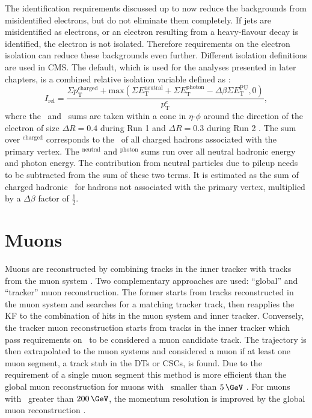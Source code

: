 The identification requirements discussed up to now reduce the backgrounds 
from misidentified electrons, but do not eliminate them completely. If jets are
misidentified as electrons, or an electron resulting from a heavy-flavour 
decay is identified, the electron is not isolated. Therefore requirements
on the electron isolation can reduce these backgrounds even further.
Different isolation definitions are used in \ac{CMS}. The default, which is
used for the analyses presented in later chapters, is a combined relative isolation variable
defined as \cite{SMHtautauCMS}:
\begin{equation}\label{eqn:electron_reliso}
I_{\text{rel}} = \frac{\Sigma p_{\text{T}}^{\text{charged}} + \mathrm{max}(\Sigma E_{\text{T}}^{\text{neutral}} + \Sigma E_{\text{T}}^{\text{photon}} - \Delta\beta \Sigma E_{\text{T}}^{\text{PU}},0)}{p_{\text{T}}^{e}},
\end{equation}
where the \pT~and \ET~sums are taken within a cone in $\eta$-$\phi$ around the direction
of the electron of size $\Delta R = 0.4$ during Run 1 and $\Delta R = 0.3$ during Run 2 \cite{CMS-PAS-HIG-16-037}.
The sum over \pT$^{\text{charged}}$ corresponds to the \pT~of all charged %
hadrons associated with the primary vertex. %
The \ET$^{\text{neutral}}$ and \ET$^{\text{photon}}$ sums
run over all neutral hadronic energy and photon energy. %
The contribution from neutral particles due to pileup needs to be subtracted from
the sum of these two terms. It is estimated as the sum of charged hadronic \pT~for hadrons not associated
with the primary vertex, multiplied by a $\Delta \beta$ factor of $\frac{1}{2}$.

\section{Muons}
\label{sec:objects_muo}
Muons are reconstructed by combining tracks in the inner tracker with tracks
from the muon system \cite{cms-muon-reco}. Two complementary approaches are used:
``global'' and ``tracker'' muon reconstruction. The former starts from 
tracks reconstructed in the muon system and searches for a matching
tracker track, then reapplies the \ac{KF} to the combination
of hits in the muon system and inner tracker. Conversely, the tracker muon reconstruction starts from
tracks in the inner tracker which pass requirements on \pT~to be considered
a muon candidate track. The trajectory is then extrapolated to the muon systems and
considered a muon if at least one muon segment, a track stub in the \acp{DT} or \acp{CSC}, is found.
Due to the requirement of a single muon segment this method is more efficient than the global muon
reconstruction for muons with \pT~smaller than $5\,\GeV$ \cite{cms-muon-reco}.
For muons with \pT~greater than $200\,\GeV$, the momentum resolution is improved
by the global muon reconstruction \cite{cms-muon-cosmics-perf}.

